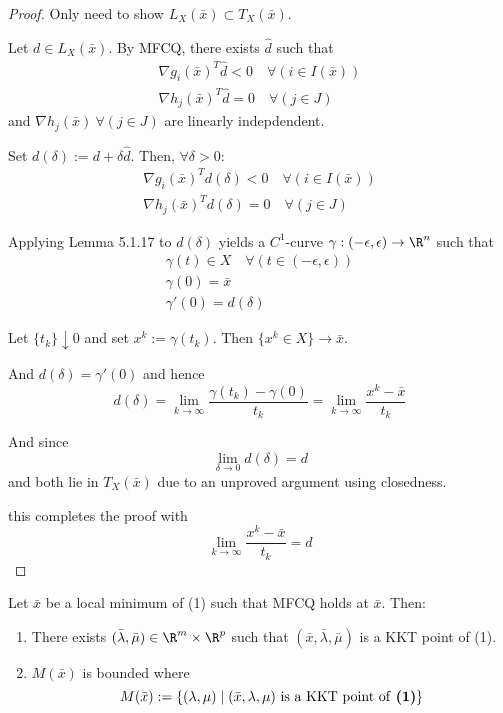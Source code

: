 \begin{proof}
	Only need to show $L_X(\bar x)\subset T_X(\bar x)$.

	Let $d\in L_X(\bar x)$. By MFCQ, there exists $\hat d$ such that
	\begin{gather*}
		\nabla g_i(\bar x)^T\hat d<0\quad\forall(i\in I(\bar x)) \\
		\nabla h_j(\bar x)^T\hat d=0\quad\forall(j\in J)
	\end{gather*}
	and $\nabla h_j(\bar x)\ \forall(j\in J)$ are linearly indepdendent.

	Set $d(\delta):= d + \delta\hat d$. Then, $\forall\delta>0$:
	\begin{gather*}
		\nabla g_i(\bar x)^T{d(\delta)}<0\quad\forall(i\in I(\bar x)) \\
		\nabla h_j(\bar x)^T{d(\delta)}=0\quad\forall(j\in J)
	\end{gather*}

	Applying Lemma 5.1.17 to $d(\delta)$ yields a $C^1$-curve
	$\gamma:(-\epsilon,\epsilon)\to\R^n$ such that
	\begin{gather*}
		\gamma(t) \in X\quad\forall(t\in(-\epsilon,\epsilon)) \\
		\gamma(0) = \bar x \\
		\gamma'(0)=d(\delta)
	\end{gather*}

	Let $\{t_k\}\downarrow0$ and set $x^k:=\gamma(t_k)$. Then
	$\{x^k\in X\}\to\bar x$.

	And $d(\delta)=\gamma'(0)$ and hence
	$$
		d(\delta)=\lim_{k\to\infty}\frac{\gamma(t_k)-\gamma(0)}{t_k}=
		\lim_{k\to\infty}\frac{x^k-\bar x}{t_k}
	$$

	And since
	$$
		\lim_{\delta\to0} d(\delta) = d
	$$
	and both lie in $T_X(\bar x)$ due to an unproved argument using
	closedness.

	this completes the proof with
	$$
		\lim_{k\to\infty}\frac{x^k-\bar x}{t_k}=d
	$$
\end{proof}


Let $\bar x$ be a local minimum of (1) such that MFCQ holds at $\bar x$. Then:

\begin{enumerate}\renewcommand{\theenumi}{\alph{enumi}}
	\item There exists $(\bar\lambda, \bar\mu)\in\R^m\times\R^p$  such
	      that $(\bar x,\bar\lambda, \bar\mu)$ is a KKT point of (1).
	\item $M(\bar x)$ is bounded where
	      $$
		      M(\bar x):=\{(\lambda,\mu)\mid(\bar x,\lambda,\mu)\text{ is a KKT point of \textbf{(1)}} \}
	      $$
\end{enumerate}

